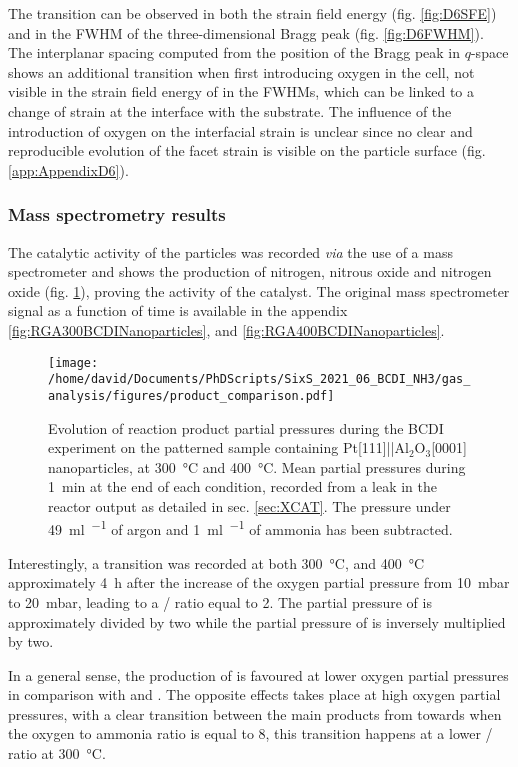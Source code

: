 The transition can be observed in both the strain field energy (fig. \ref{fig:D6SFE}) and in the FWHM of the three-dimensional Bragg peak (fig. \ref{fig:D6FWHM}).
The interplanar spacing computed from the position of the Bragg peak in $q$-space shows an additional transition when first introducing oxygen in the cell, not visible in the strain field energy of in the FWHMs, which can be linked to a change of strain at the interface with the substrate.
The influence of the introduction of oxygen on the interfacial strain is unclear since no clear and reproducible evolution of the facet strain is visible on the particle surface (fig. \ref{app:AppendixD6}).

\subsubsection{Mass spectrometry results}

The catalytic activity of the particles was recorded \textit{via} the use of a mass spectrometer and shows the production of nitrogen, nitrous oxide and nitrogen oxide (fig. \ref{fig:RGANanoparticlesBCDIComparison}), proving the activity of the catalyst.
The original mass spectrometer signal as a function of time is available in the appendix \ref{fig:RGA300BCDINanoparticles}, and \ref{fig:RGA400BCDINanoparticles}.

\begin{figure}[!htb]
    \centering
    \texttt{[image: /home/david/Documents/PhDScripts/SixS\_2021\_06\_BCDI\_NH3/gas\_analysis/figures/product\_comparison.pdf]}
    \caption{
        Evolution of reaction product partial pressures during the BCDI experiment on the patterned sample containing Pt[111]||Al$_2$O$_3$[0001] nanoparticles, at \qty{300}{\degreeCelsius} and \qty{400}{\degreeCelsius}.
        Mean partial pressures during \qty{1}{\minute} at the end of each condition, recorded from a leak in the reactor output as detailed in sec. \ref{sec:XCAT}.
        The pressure under \qty{49}{\ml\per\min} of argon and \qty{1}{\ml\per\min} of ammonia has been subtracted.
    }
    \label{fig:RGANanoparticlesBCDIComparison}
\end{figure}

Interestingly, a transition was recorded at both \qty{300}{\degreeCelsius}, and \qty{400}{\degreeCelsius} approximately \qty{4}{\hour} after the increase of the oxygen partial pressure from \qty{10}{\milli\bar} to \qty{20}{\milli\bar}, leading to a / ratio equal to 2.
The partial pressure of  is approximately divided by two while the partial pressure of  is inversely multiplied by two.

In a general sense, the production of  is favoured at lower oxygen partial pressures in comparison with  and .
The opposite effects takes place at high oxygen partial pressures, with a clear transition between the main products from  towards  when the oxygen to ammonia ratio is equal to 8, this transition happens at a lower / ratio at \qty{300}{\degreeCelsius}.
